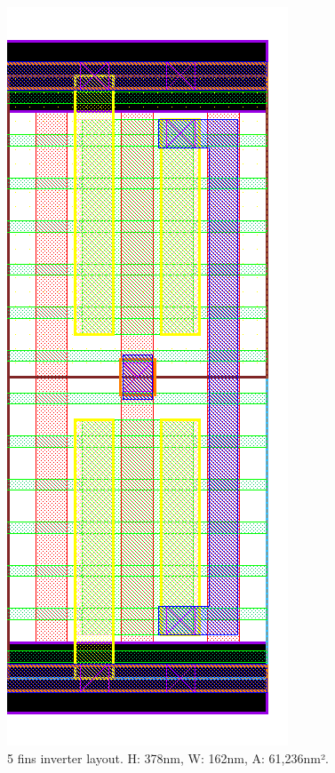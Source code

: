 \documentclass[pgmicro,diss,english]{iiufrgs}
\begin{document}
\begin{figure}[]
\centering
\includegraphics[width=\textwidth,height=\textheight,keepaspectratio]{INV5F.png}
\caption{5 fins inverter layout. H: 378nm, W: 162nm, A: 61,236nm².}
\label{fig:INV5F}
\end{figure}
\end{document}
